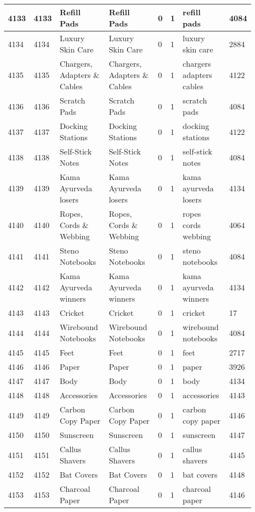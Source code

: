 \begin{longtable}{|l|l|l|l|l|l|l|l|}
4133 & 4133 & Refill Pads & Refill Pads & 0 & 1 & refill pads & 4084 \\ \hline 
4134 & 4134 & Luxury Skin Care & Luxury Skin Care & 0 & 1 & luxury skin care & 2884 \\ \hline 
4135 & 4135 & Chargers, Adapters \& Cables & Chargers, Adapters \& Cables & 0 & 1 & chargers adapters cables & 4122 \\ \hline 
4136 & 4136 & Scratch Pads & Scratch Pads & 0 & 1 & scratch pads & 4084 \\ \hline 
4137 & 4137 & Docking Stations & Docking Stations & 0 & 1 & docking stations & 4122 \\ \hline 
4138 & 4138 & Self-Stick Notes & Self-Stick Notes & 0 & 1 & self-stick notes & 4084 \\ \hline 
4139 & 4139 & Kama Ayurveda losers & Kama Ayurveda losers & 0 & 1 & kama ayurveda losers & 4134 \\ \hline 
4140 & 4140 & Ropes, Cords \& Webbing & Ropes, Cords \& Webbing & 0 & 1 & ropes cords webbing & 4064 \\ \hline 
4141 & 4141 & Steno Notebooks & Steno Notebooks & 0 & 1 & steno notebooks & 4084 \\ \hline 
4142 & 4142 & Kama Ayurveda winners & Kama Ayurveda winners & 0 & 1 & kama ayurveda winners & 4134 \\ \hline 
4143 & 4143 & Cricket & Cricket & 0 & 1 & cricket & 17 \\ \hline 
4144 & 4144 & Wirebound Notebooks & Wirebound Notebooks & 0 & 1 & wirebound notebooks & 4084 \\ \hline 
4145 & 4145 & Feet & Feet & 0 & 1 & feet & 2717 \\ \hline 
4146 & 4146 & Paper & Paper & 0 & 1 & paper & 3926 \\ \hline 
4147 & 4147 & Body & Body & 0 & 1 & body & 4134 \\ \hline 
4148 & 4148 & Accessories & Accessories & 0 & 1 & accessories & 4143 \\ \hline 
4149 & 4149 & Carbon Copy Paper & Carbon Copy Paper & 0 & 1 & carbon copy paper & 4146 \\ \hline 
4150 & 4150 & Sunscreen & Sunscreen & 0 & 1 & sunscreen & 4147 \\ \hline 
4151 & 4151 & Callus Shavers & Callus Shavers & 0 & 1 & callus shavers & 4145 \\ \hline 
4152 & 4152 & Bat Covers & Bat Covers & 0 & 1 & bat covers & 4148 \\ \hline 
4153 & 4153 & Charcoal Paper & Charcoal Paper & 0 & 1 & charcoal paper & 4146 \\ \hline 

\end{longtable}
